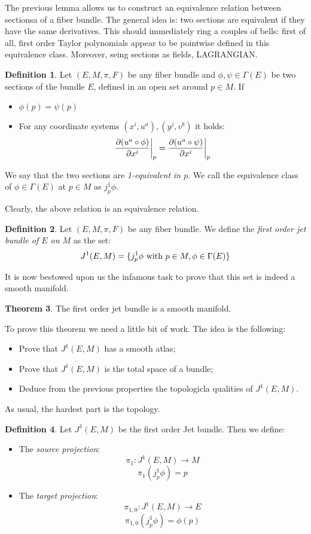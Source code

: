 \documentclass[12pt,a4paper]{report}
\theoremstyle{definition}
\newtheorem{Def}{Definition}[chapter]
\theoremstyle{Theorem}
\newtheorem{Theo}[Def]{Theorem}
\theoremstyle{definition}
\theoremstyle{definition}
\begin{document}
	The previous lemma allows us to construct an equivalence relation between sectionsa of a fiber bundle. The general idea is: two sections are equivalent if they have the same derivatives. This should immediately ring a couples of bells: first of all, first order Taylor polynomials appear to be pointwise defined in this equivalence class. Moreover, seing sections as fields, LAGRANGIAN.
	\begin{Def}
		Let $(E,M,\pi,F)$ be any fiber bundle and $\phi,\psi\in\Gamma(E)$ be two sections of the bundle $E$, defined in an open set around $p\in M$. If
		\begin{itemize}
			\item $\phi(p)=\psi(p)$ 
			\item For any coordinate systems $(x^i,u^a),(y^j,v^b)$ it holds:
			$${\partial(u^a\circ\phi) \over \partial{x^i}}\bigg|_p={\partial(u^a\circ\psi) \over \partial{x^i}}\bigg|_p$$
		\end{itemize} 
		We say that the two sections are \textit{1-equivalent in $p$}. We call the equivalence class of $\phi\in\Gamma(E)$ at $p\in M$ as $j_p^1\phi$.
	\end{Def}
	Clearly, the above relation is an equivalence relation.
	\begin{Def}
		Let $(E,M,\pi,F)$ be any fiber bundle. We define the \textit{first order jet bundle of $E$ on $M$} as the set:
		$$J^1(E,M)=\{j^1_p\phi \hbox{ with }p\in M, \phi\in\Gamma(E)\}$$
	\end{Def}
	It is now bestowed upon us the infamous task to prove that this set is indeed a smooth manifold.
	\begin{Theo}
		The first order jet bundle is a smooth manifold.
	\end{Theo}
	To prove this theorem we need a little bit of work. The idea is the following:
	\begin{itemize}
		\item Prove that $J^1(E,M)$ has a smooth atlas;
		\item Prove that $J^1(E,M)$ is the total space of a bundle;
		\item Deduce from the previous properties the topologicla qualities of $J^1(E,M)$. 
	\end{itemize}
	As usual, the hardest part is the topology.
	\begin{Def}
		Let $J^1(E,M)$ be the first order Jet bundle. Then we define:
		\begin{itemize}
			\item The \textit{source projection}:
			$$
				\pi_{1}:J^1(E,M)\longrightarrow M $$
				$$
				\pi_1(j^1_p\phi)=p$$	
			\item The \textit{target projection}:
			$$
			\pi_{1,0}:J^1(E,M)\longrightarrow E $$
			$$
			\pi_{1,0}(j^1_p\phi)=\phi(p)$$		
		\end{itemize}
	\end{Def}
\end{document}

